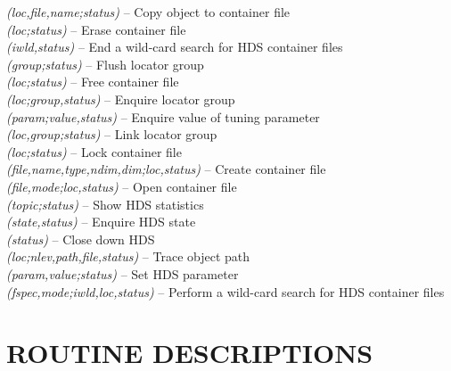 \documentclass[twoside,11pt]{starlink}
\providecommand{\st}[1]{{\emph{#1}}}
\begin{document}
\label{appendix:hdsroutines}
\textbf{}\st{(loc,file,name;status)} -- Copy object to container file \\
\textbf{}\st{(loc;status)} -- Erase container file \\
\textbf{}\st{(iwld,status)} -- End a wild-card search for HDS container
files \\
\textbf{}\st{(group;status)} -- Flush locator group \\
\textbf{}\st{(loc;status)} -- Free container file \\
\textbf{}\st{(loc;group,status)} -- Enquire locator group \\
\textbf{}\st{(param;value,status)} -- Enquire value of tuning parameter \\
\textbf{}\st{(loc,group;status)} -- Link locator group \\
\textbf{}\st{(loc;status)} -- Lock container file \\
\textbf{}\st{(file,name,type,ndim,dim;loc,status)} -- Create container file \\
\textbf{}\st{(file,mode;loc,status)} -- Open container file \\
\textbf{}\st{(topic;status)} -- Show HDS statistics \\
\textbf{}\st{(state,status)} -- Enquire HDS state \\
\textbf{}\st{(status)} -- Close down HDS \\
\textbf{}\st{(loc;nlev,path,file,status)} -- Trace object path \\
\textbf{}\st{(param,value;status)} -- Set HDS parameter \\
\textbf{}\st{(fspec,mode;iwld,loc,status)} -- Perform a wild-card search
for HDS container files
\normalsize

\newpage
\section{\label{appendix:routines}ROUTINE DESCRIPTIONS}
\end{document}
